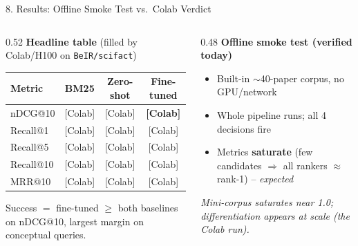 \documentclass[10pt,aspectratio=169]{beamer}
\begin{document}
\begin{frame}{8. Results: Offline Smoke Test vs.\ Colab Verdict}
\begin{columns}[T]
\begin{column}{0.52\textwidth}
\textbf{Headline table} (filled by Colab/H100 on \texttt{BeIR/scifact})
\begin{table}[h]
\centering\scriptsize
\begin{tabular}{lccc}
\toprule
\textbf{Metric} & \textbf{BM25} & \textbf{Zero-shot} & \textbf{Fine-tuned} \\
\midrule
nDCG@10 & [Colab] & [Colab] & \textbf{[Colab]} \\
Recall@1 & [Colab] & [Colab] & [Colab] \\
Recall@5 & [Colab] & [Colab] & [Colab] \\
Recall@10 & [Colab] & [Colab] & [Colab] \\
MRR@10 & [Colab] & [Colab] & [Colab] \\
\bottomrule
\end{tabular}
\end{table}
\scriptsize Success $=$ fine-tuned $\geq$ both baselines on nDCG@10, largest margin on conceptual queries.
\end{column}
\begin{column}{0.48\textwidth}
\textbf{Offline smoke test (verified today)}
\begin{itemize}\scriptsize
  \item Built-in $\sim$40-paper corpus, no GPU/network
  \item Whole pipeline runs; all 4 decisions fire
  \item Metrics \textbf{saturate} (few candidates $\Rightarrow$ all rankers $\approx$ rank-1) -- \emph{expected}
\end{itemize}

\vspace{0.1cm}
\centering
{}

\scriptsize \emph{Mini-corpus saturates near 1.0; differentiation appears at scale (the Colab run).}
\end{column}
\end{columns}
\end{frame}
\end{document}
